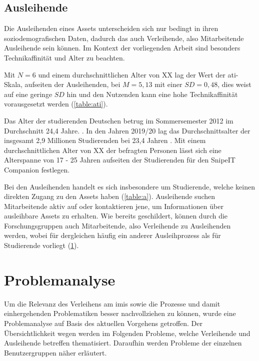 \subsection{Ausleihende}
Die Ausleihenden eines Assets unterscheiden sich nur bedingt in ihren soziodemografischen Daten,
dadurch das auch Verleihende, also Mitarbeitende Ausleihende sein können. Im Kontext der
vorliegenden Arbeit sind besonders Technikaffinität und Alter zu beachten.

Mit $N=6$ und einem durchschnittlichen Alter von XX lag der Wert der \ac{ati}-Skala, aufseiten der
Ausleihenden, bei $M=5,13$ mit einer $SD=0,48$, dies weist auf eine geringe $SD$ hin und den
Nutzenden kann eine hohe Technikaffinität vorausgesetzt werden  (\ref{table:ati}).

Das Alter der studierenden Deutschen betrug im Sommersemester 2012 im Durchschnitt 24,4
Jahre. \cite{middendorff2017wirtschaftliche}. In den Jahren 2019/20 lag das Durchschnittsalter der
insgesamt 2,9 Millionen Studierenden bei 23,4 Jahren \cite{noauthor_studierende_nodate}. Mit einem
durchschnittlichen Alter von XX der befragten Personen lässt sich eine Alterspanne von 17 - 25
Jahren aufseiten der Studierenden für den SnipeIT Companion festlegen.

Bei den Ausleihenden handelt es sich insbesondere um Studierende, welche keinen direkten Zugang zu
den Assets haben (\ref{table:a}). Ausleihende suchen Mitarbeitende aktiv auf oder kontaktieren jene,
um Informationen über ausleihbare Assets zu erhalten. Wie bereits geschildert, können durch die
Forschungsgruppen auch Mitarbeitende, also Verleihende zu Ausleihenden werden, wobei für dergleichen
häufig ein anderer Ausleihprozess als für Studierende vorliegt (\ref{section:iststand}).


\section{Problemanalyse}
\label{section:iststand}

Um die Relevanz des Verleihens am \ac{imis} sowie die Prozesse und damit einhergehenden
Problematiken besser nachvollziehen zu können, wurde eine Problemanalyse auf Basis des aktuellen
Vorgehens getroffen. Der Übersichtlichkeit wegen werden im Folgenden Probleme, welche Verleihende
und Ausleihende betreffen thematisiert. Daraufhin werden Probleme der einzelnen Benutzergruppen
näher erläutert.

